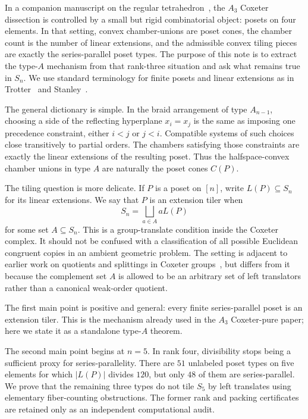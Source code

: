 In a companion manuscript on the regular tetrahedron~\cite{BabanskyyTetraCoxeterPure2026}, the $A_3$
Coxeter dissection is controlled by a small but rigid combinatorial
object: posets on four elements.  In that setting, convex chamber-unions
are poset cones, the chamber count is the number of linear extensions, and
the admissible convex tiling pieces are exactly the series-parallel poset
types.  The purpose of this note is to extract the type-$A$ mechanism from
that rank-three situation and ask what remains true in $S_n$.
We use standard terminology for finite posets and linear extensions as in
Trotter~\cite{Trotter1992} and Stanley~\cite{Stanley2012}.

The general dictionary is simple.  In the braid arrangement of type
$A_{n-1}$, choosing a side of the reflecting hyperplane $x_i=x_j$ is the
same as imposing one precedence constraint, either $i<j$ or $j<i$.
Compatible systems of such choices close transitively to partial orders.
The chambers satisfying those constraints are exactly the linear
extensions of the resulting poset.  Thus the halfspace-convex chamber
unions in type $A$ are naturally the poset cones $C(P)$.

The tiling question is more delicate.  If $P$ is a poset on $[n]$, write
$L(P)\subseteq S_n$ for its linear extensions.  We say that $P$ is an
extension tiler when
\[
        S_n=\bigsqcup_{a\in A} aL(P)
\]
for some set $A\subseteq S_n$.  This is a group-translate condition inside
the Coxeter complex.  It should not be confused with a classification of
all possible Euclidean congruent copies in an ambient geometric problem.
The setting is adjacent to earlier work on quotients and splittings in
Coxeter groups~\cite{BjornerWachs1988,GaetzGao2020}, but differs from it
because the complement set $A$ is allowed to be an arbitrary set of left
translators rather than a canonical weak-order quotient.

The first main point is positive and general: every finite
series-parallel poset is an extension tiler.  This is the mechanism already
used in the $A_3$ Coxeter-pure paper; here we state it as a standalone
type-$A$ theorem.

The second main point begins at $n=5$.  In rank four, divisibility stops
being a sufficient proxy for series-parallelity.  There are $51$
unlabeled poset types on five elements for which $|L(P)|$ divides $120$,
but only $48$ of them are series-parallel.  We prove that the remaining
three types do not tile $S_5$ by left translates using elementary
fiber-counting obstructions.  The former rank and packing certificates
are retained only as an independent computational audit.

